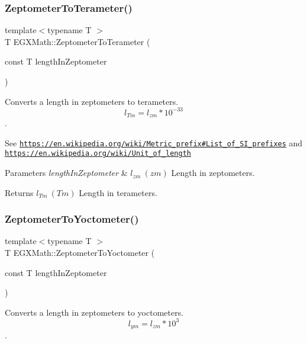 \subsubsection{\texorpdfstring{Zeptometer\+To\+Terameter()}{ZeptometerToTerameter()}}
{\footnotesize\ttfamily template$<$typename T $>$ \\
T E\+G\+X\+Math\+::\+Zeptometer\+To\+Terameter (\begin{DoxyParamCaption}\item[{const T}]{length\+In\+Zeptometer }\end{DoxyParamCaption})}



Converts a length in zeptometers to terameters. \[ l_{Tm}=l_{zm} * 10^{-33} \]. 

See \href{https://en.wikipedia.org/wiki/Metric_prefix#List_of_SI_prefixes}{\tt https\+://en.\+wikipedia.\+org/wiki/\+Metric\+\_\+prefix\#\+List\+\_\+of\+\_\+\+S\+I\+\_\+prefixes} and \href{https://en.wikipedia.org/wiki/Unit_of_length}{\tt https\+://en.\+wikipedia.\+org/wiki/\+Unit\+\_\+of\+\_\+length} 
\begin{DoxyParams}{Parameters}
{\em length\+In\+Zeptometer} & $ l_{zm}\ (zm)$ Length in zeptometers. \\
\hline
\end{DoxyParams}
\begin{DoxyReturn}{Returns}
$ l_{Tm}\ (Tm)$ Length in terameters. 
\end{DoxyReturn}
\mbox{\label{group___e_g_x_math-_conversions-_length_conversions-_zeptometer-_s_i_ga0477d1a8cb246721ce00cfd7b73d5c9e}} 
\subsubsection{\texorpdfstring{Zeptometer\+To\+Yoctometer()}{ZeptometerToYoctometer()}}
{\footnotesize\ttfamily template$<$typename T $>$ \\
T E\+G\+X\+Math\+::\+Zeptometer\+To\+Yoctometer (\begin{DoxyParamCaption}\item[{const T}]{length\+In\+Zeptometer }\end{DoxyParamCaption})}



Converts a length in zeptometers to yoctometers. \[ l_{ym}=l_{zm} * 10^{3} \]. 

